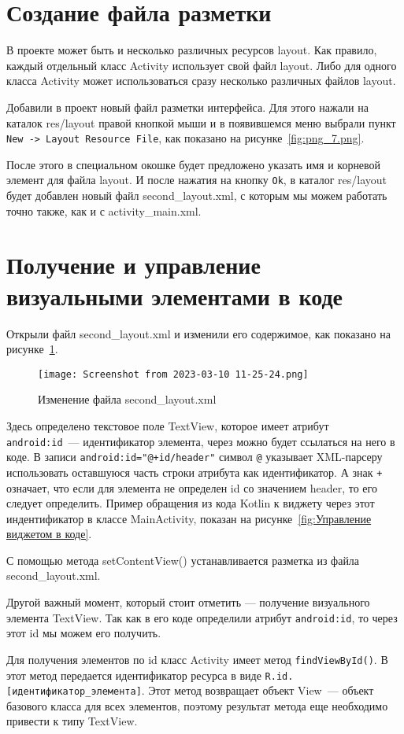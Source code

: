 \section{Создание файла разметки}
В проекте может быть и несколько различных ресурсов layout. Как правило,
каждый отдельный класс Activity использует свой файл layout. Либо для
одного класса Activity может использоваться сразу несколько различных
файлов layout.\par
Добавили в проект новый файл разметки интерфейса. Для этого
нажали на каталок res/layout правой кнопкой мыши и в появившемся меню
выбрали пункт \texttt{New -> Layout Resource File}, как показано
на рисунке~\ref{fig:png_7.png}.


После этого в специальном окошке будет предложено указать имя и
корневой элемент для файла layout. И после нажатия на кнопку \texttt{Ok},
в каталог res/layout будет добавлен новый файл second\_layout.xml,
с которым мы можем работать точно также, как и с activity\_main.xml.\par

\section{Получение и управление визуальными элементами в коде}
Открыли файл second\_layout.xml и изменили его содержимое, как показано
на рисунке~\ref{fig:xml:textview:d}.

\begin{figure}[h!tp]
	\centering
	\texttt{[image: Screenshot from 2023-03-10 11-25-24.png]}
	\caption{Изменение файла second\_layout.xml}
	\label{fig:xml:textview:d}
\end{figure}

Здесь определено текстовое поле TextView, которое имеет
атрибут \texttt{android:id}~--- идентификатор элемента,
через можно будет ссылаться на него в коде.
В записи \texttt{android:id="@+id/header"} символ
\texttt{@} указывает XML-парсеру использовать оставшуюся часть строки
атрибута как идентификатор. А знак \texttt{+} означает, что если для
элемента не определен id со значением header, то его следует
определить.
Пример обращения из кода Kotlin к виджету через этот индентификатор в
классе MainActivity, показан на рисунке~\ref{fig:Управление виджетом в коде}.

С помощью метода setContentView() устанавливается разметка из файла
second\_layout.xml.\par
Другой важный момент, который стоит отметить --- получение визуального
элемента TextView. Так как в его коде определили атрибут \texttt{android:id},
то через этот id мы можем его получить.\par
Для получения элементов по id класс Activity имеет метод
\texttt{findViewById()}. В этот метод передается идентификатор ресурса в виде
\texttt{R.id.[идентификатор\_элемента]}. Этот метод возвращает объект View~---
объект базового класса для всех элементов, поэтому результат метода еще
необходимо привести к типу TextView.


